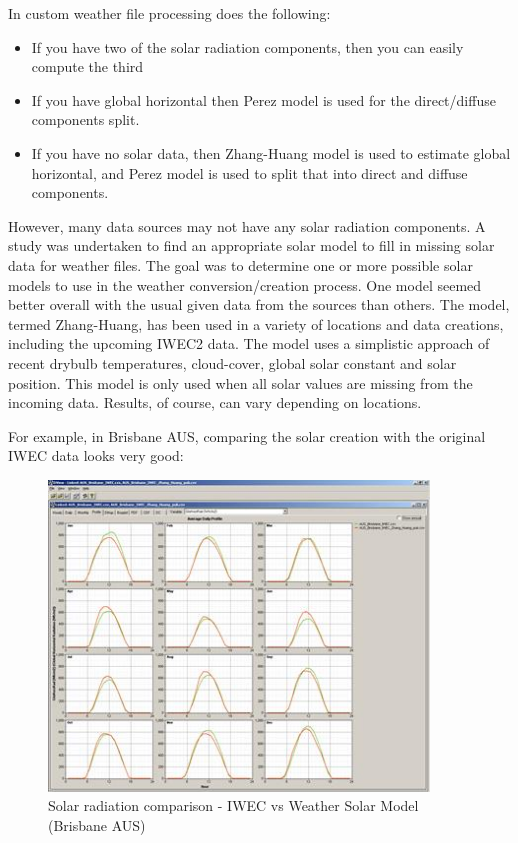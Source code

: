 In custom weather file processing does the following:

\begin{itemize}
\tightlist
\item
  If you have two of the solar radiation components, then you can easily compute the third
\item
  If you have global horizontal then Perez model is used for the direct/diffuse components split.
\item
  If you have no solar data, then Zhang-Huang model is used to estimate global horizontal, and Perez model is used to split that into direct and diffuse components.
\end{itemize}

However, many data sources may not have any solar radiation components. A study was undertaken to find an appropriate solar model to fill in missing solar data for weather files. The goal was to determine one or more possible solar models to use in the weather conversion/creation process. One model seemed better overall with the usual given data from the sources than others. The model, termed Zhang-Huang, has been used in a variety of locations and data creations, including the upcoming IWEC2 data. The model uses a simplistic approach of recent drybulb temperatures, cloud-cover, global solar constant and solar position. This model is only used when all solar values are missing from the incoming data. Results, of course, can vary depending on locations.

For example, in Brisbane AUS, comparing the solar creation with the original IWEC data looks very good:

\begin{figure}[hbtp] %
\centering
\includegraphics[width=0.9\textwidth, height=0.9\textheight, keepaspectratio=true]{media/image006.jpg}
\caption{Solar radiation comparison - IWEC vs Weather Solar Model (Brisbane AUS) \protect \label{fig:solar-radiation-comparison-iwec-vs-weather}}
\end{figure}


